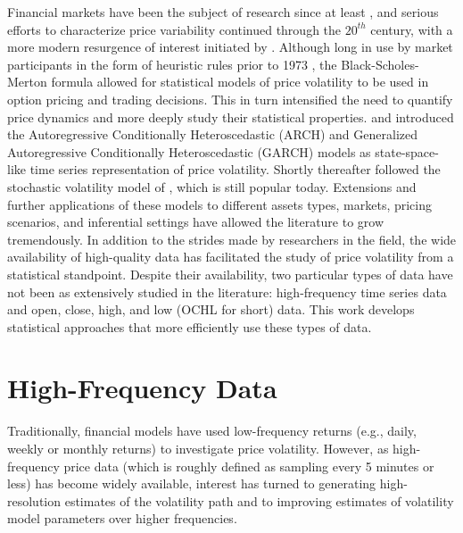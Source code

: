 \label{ch:introduction}

Financial markets have been the subject of research since at least
\cite{bachelier1900theorie}, and serious efforts to characterize price
variability continued through the $20^{th}$ century, with a more
modern resurgence of interest initiated by
\cite{mandelbrot1967variation}. Although long in use by market
participants in the form of heuristic rules prior to 1973
\citep{haug2011option}, the Black-Scholes-Merton formula
\citep{black1973pricing, merton1973theory} allowed for
statistical models of price volatility to be used in option pricing
and trading decisions. This in turn intensified the need to quantify
price dynamics and more deeply study their statistical
properties. \cite{engle1982} and \cite{bollerslev1986} introduced the
Autoregressive Conditionally Heteroscedastic (ARCH) and Generalized
Autoregressive Conditionally Heteroscedastic (GARCH) models as
state-space-like time series representation of price
volatility. Shortly thereafter followed the stochastic volatility
model of \cite{hull1987pricing}, which is still popular
today. Extensions and further applications of these models to
different assets types, markets, pricing scenarios, and inferential
settings have allowed the literature to grow tremendously. In addition
to the strides made by researchers in the field, the wide availability
of high-quality data has facilitated the study of price volatility
from a statistical standpoint. Despite their availability, two
particular types of data have not been as extensively studied in the
literature: high-frequency time series data and open, close, high, and
low (OCHL for short) data. This work develops statistical approaches
that more efficiently use these types of data.

\section{High-Frequency Data}
Traditionally, financial models have used low-frequency returns (e.g.,
daily, weekly or monthly returns) to investigate price
volatility. However, as high-frequency price data (which is roughly
defined as sampling every 5 minutes or less) has become widely
available, interest has turned to generating high-resolution estimates
of the volatility path and to improving estimates of volatility model
parameters over higher frequencies.

